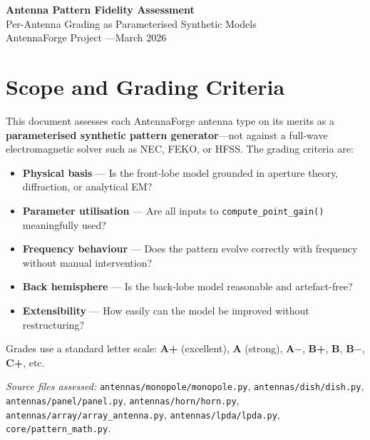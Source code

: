 \documentclass[11pt,a4paper]{article}
\begin{document}
\begin{center}
    {\Huge\bfseries\color{afdark} Antenna Pattern Fidelity Assessment}\\[0.5em]
    {\large\color{afgray} Per-Antenna Grading as Parameterised Synthetic Models}\\[1em]
    {\color{afgray} AntennaForge Project \quad---\quad March 2026}
\end{center}
\vspace{1em}

\section{Scope and Grading Criteria}

This document assesses each AntennaForge antenna type on its merits as a
\textbf{parameterised synthetic pattern generator}---not against a full-wave
electromagnetic solver such as NEC, FEKO, or HFSS. The grading criteria are:

\begin{itemize}[nosep]
    \item \textbf{Physical basis} --- Is the front-lobe model grounded in
          aperture theory, diffraction, or analytical EM?
    \item \textbf{Parameter utilisation} --- Are all inputs to
          \texttt{compute\_point\_gain()} meaningfully used?
    \item \textbf{Frequency behaviour} --- Does the pattern evolve correctly
          with frequency without manual intervention?
    \item \textbf{Back hemisphere} --- Is the back-lobe model reasonable and
          artefact-free?
    \item \textbf{Extensibility} --- How easily can the model be improved
          without restructuring?
\end{itemize}

\noindent
Grades use a standard letter scale: \textbf{A+} (excellent),
\textbf{A} (strong), \textbf{A$-$}, \textbf{B+}, \textbf{B},
\textbf{B$-$}, \textbf{C+}, etc.

\bigskip
\noindent
\textit{Source files assessed:}
\texttt{antennas/monopole/monopole.py},
\texttt{antennas/dish/dish.py},
\texttt{antennas/panel/panel.py},
\texttt{antennas/horn/horn.py},
\texttt{antennas/array/array\_antenna.py},
\texttt{antennas/lpda/lpda.py},
\texttt{core/pattern\_math.py}.
\end{document}
